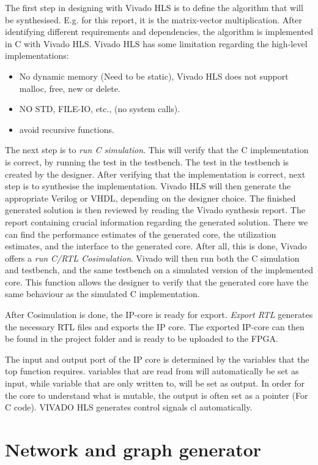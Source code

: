 The first step in designing with Vivado HLS is to define the algorithm that will be synthesised. E.g. for this report, it is the matrix-vector multiplication. After identifying different requirements and dependencies, the algorithm is implemented in C with Vivado HLS. Vivado HLS has some limitation regarding the high-level implementations:
\begin{itemize}
\item No dynamic memory (Need to be static), Vivado HLS does not support malloc, free, new or delete. 
\item NO STD, FILE-IO, etc., (no system calls). 
\item avoid recursive functions. 
\end{itemize}

The next step is to \textit{run C simulation}. This will verify that the C implementation is correct, by running the test in the testbench. The test in the testbench is created by the designer. After verifying that the implementation is correct, next step is to synthesise the implementation. Vivado HLS will then generate the appropriate Verilog or VHDL, depending on the designer choice. The finished generated solution is then reviewed by reading the Vivado synthesis report. The report containing crucial information regarding the generated solution. There we can find the performance estimates of the generated core, the utilization estimates, and the interface to the generated core. After all, this is done, Vivado offers a \textit{run C/RTL Cosimulation}. Vivado will then run both the C simulation and testbench, and the same testbench on a simulated version of the implemented core. This function allows the designer to verify that the generated core have the same behaviour as the simulated C implementation.

After Cosimulation is done, the IP-core is ready for export. \textit{Export RTL} generates the necessary RTL files and exports the IP core. The exported IP-core can then be found in the project folder and is ready to be uploaded to the FPGA. 

The input and output port of the IP core is determined by the variables that the top function requires. variables that are read from will automatically be set as input, while variable that are only written to, will be set as output. In order for the core to understand what is mutable, the output is often set as a pointer (For C code). VIVADO HLS generates control signals cl automatically. 

\section{Network and graph generator}

